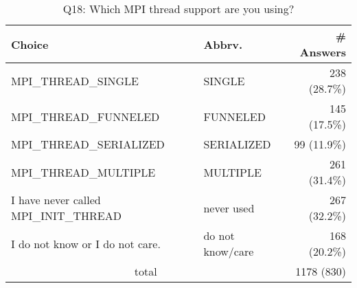 \begin{table}[htb]%
\begin{center}%
\caption{Q18: Which MPI thread support are you using?}%
\label{tab:Q18-ans}%
\begin{tabular}{l|l|r}%
\hline%
Choice & Abbrv. & \# Answers \\%
\hline%
MPI\_THREAD\_SINGLE & SINGLE & 238 (28.7\%) \\%
MPI\_THREAD\_FUNNELED & FUNNELED & 145 (17.5\%) \\%
MPI\_THREAD\_SERIALIZED & SERIALIZED & 99 (11.9\%) \\%
MPI\_THREAD\_MULTIPLE & MULTIPLE & 261 (31.4\%) \\%
I have never called MPI\_INIT\_THREAD & never used & 267 (32.2\%) \\%
I do not know or I do not care. & do not know/care & 168 (20.2\%) \\%
\hline%
\multicolumn{2}{c}{total} & 1178 (830)\\%
\hline%
\end{tabular}%
\end{center}%
\end{table}%
